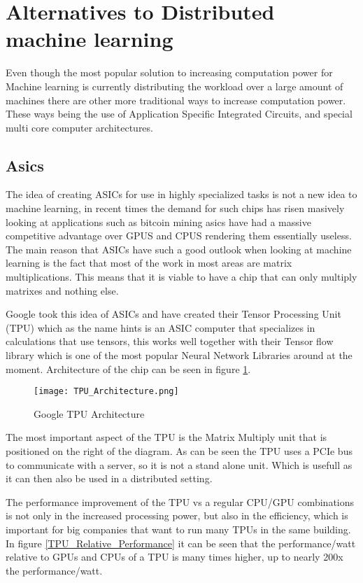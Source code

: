 
\section{Alternatives to Distributed machine learning}
Even though the most popular solution to increasing computation power for Machine
learning is currently distributing the workload over a large amount of machines
there are other more traditional ways to increase computation power. These ways
being the use of Application Specific Integrated Circuits, and special multi core
computer architectures.

\subsection{Asics}
The idea of creating ASICs for use in highly specialized tasks is not a new idea
to machine learning, in recent times the demand for such chips has risen masively\cite{Metz18}
looking at applications such as bitcoin mining asics have had a massive competitive
advantage over GPUS and CPUS rendering them essentially useless. The main reason
that ASICs have such a good outlook when looking at machine
learning is the fact that most of the work in most areas are matrix multiplications.
This means that it is viable to have a chip that can only multiply matrixes and nothing
else.

Google took this idea of ASICs and have created their Tensor Processing Unit (TPU)\cite{Sato17}
which as the name hints is an ASIC computer that specializes in calculations that
use tensors, this works well together with their Tensor flow library which is one
of the most popular Neural Network Libraries around at the moment. Architecture of
the chip can be seen in figure \ref{TPU_Architecture}.

\begin{figure}
  \texttt{[image: TPU\_Architecture.png]}
  \caption{Google TPU Architecture\cite{Joup17}}
  \label{TPU_Architecture}
\end{figure}

The most important aspect of the TPU is the Matrix Multiply unit that is positioned
on the right of the diagram. As can be seen the TPU uses a PCIe bus to communicate
with a server, so it is not a stand alone unit. Which is usefull as it can then also
be used in a distributed setting.

The performance improvement of the TPU vs a regular CPU/GPU combinations is not only
in the increased processing power, but also in the efficiency, which is important
for big companies that want to run many TPUs in the same building. In figure \ref{TPU_Relative_Performance}
it can be seen that the performance/watt relative to GPUs and CPUs of a TPU is many times higher,
up to nearly 200x the performance/watt.

